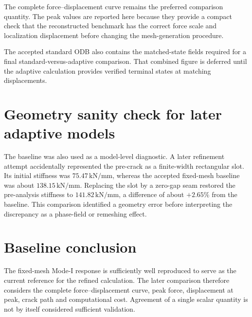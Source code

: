 The complete force--displacement curve remains the preferred comparison quantity. The peak values are reported here because they provide a compact check that the reconstructed benchmark has the correct force scale and localization displacement before changing the mesh-generation procedure.

The accepted standard ODB also contains the matched-state fields required for a final standard-versus-adaptive comparison. That combined figure is deferred until the adaptive calculation provides verified terminal states at matching displacements.

\section{Geometry sanity check for later adaptive models}
The baseline was also used as a model-level diagnostic. A later refinement attempt accidentally represented the pre-crack as a finite-width rectangular slot. Its initial stiffness was $75.47\,\mathrm{kN/mm}$, whereas the accepted fixed-mesh baseline was about $138.15\,\mathrm{kN/mm}$. Replacing the slot by a zero-gap seam restored the pre-analysis stiffness to $141.82\,\mathrm{kN/mm}$, a difference of about $+2.65\%$ from the baseline. This comparison identified a geometry error before interpreting the discrepancy as a phase-field or remeshing effect.

\section{Baseline conclusion}
The fixed-mesh Mode-I response is sufficiently well reproduced to serve as the current reference for the refined calculation. The later comparison therefore considers the complete force--displacement curve, peak force, displacement at peak, crack path and computational cost. Agreement of a single scalar quantity is not by itself considered sufficient validation.
